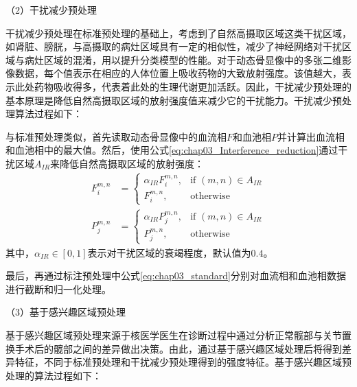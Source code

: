 （2）干扰减少预处理

干扰减少预处理在标准预处理的基础上，考虑到了自然高摄取区域这类干扰区域，如肾脏、膀胱，与高摄取的病灶区域具有一定的相似性，减少了神经网络对干扰区域与病灶区域的混淆，用以提升分类模型的性能。对于动态骨显像中的多张二维影像数据，每个值表示在相应的人体位置上吸收药物的大致放射强度。该值越大，表示此处药物吸收得多，代表着此处的生理代谢更加活跃。因此，干扰减少预处理的基本原理是降低自然高摄取区域的放射强度值来减少它的干扰能力。干扰减少预处理算法过程如下：

与标准预处理类似，首先读取动态骨显像中的血流相\(F\)和血池相\(P\)并计算出血流相和血池相中的最大值。然后，使用公式\ref{eq:chap03_Interference_reduction}通过干扰区域\(A_{IR}\)来降低自然高摄取区域的放射强度：
\begin{equation}
  \begin{aligned}
    F_i^{m, n} & =
    \begin{cases}
      \alpha_{IR}F_i^{m, n}, & \text{if \((m,n) \in A_{IR}\)} \\
      F_i^{m, n},            & \text{otherwise}
    \end{cases} \\
    P_j^{m, n} & =
    \begin{cases}
      \alpha_{IR}P_j^{m, n}, & \text{if \((m,n) \in A_{IR}\)} \\
      P_j^{m, n},            & \text{otherwise}
    \end{cases}
  \end{aligned}
  \label{eq:chap03_Interference_reduction}
\end{equation}
其中，\(\alpha_{IR} \in [0, 1]\)表示对干扰区域的衰竭程度，默认值为\(0.4\)。

最后，再通过标注预处理中公式\ref{eq:chap03_standard}分别对血流相和血池相数据进行截断和归一化处理。

（3）基于感兴趣区域预处理

基于感兴趣区域预处理来源于核医学医生在诊断过程中通过分析正常髋部与关节置换手术后的髋部之间的差异做出决策。由此，通过基于感兴趣区域处理后将得到差异特征，不同于标准预处理和干扰减少预处理得到的强度特征。基于感兴趣区域预处理的算法过程如下：

